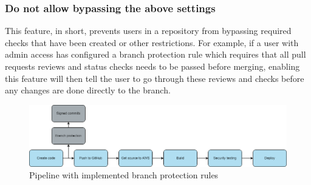 \subsubsection{Do not allow bypassing the above settings}
This feature, in short, prevents users in a repository from bypassing required checks that have been created or other restrictions. For example, if a user with admin access has configured a branch protection rule which requires that all pull requests reviews and status checks needs to be passed before merging, enabling this feature will then tell the user to go through these reviews and checks before any changes are done directly to the branch. 

\vspace{2mm}
\begin{figure}[H]
    \centering
    \includegraphics[width=0.8\columnwidth]{Images/pipeline6.png}
    \caption{Pipeline with implemented branch protection rules}
    \label{fig: Pipeline with implemented branch protection rules}
\end{figure}

